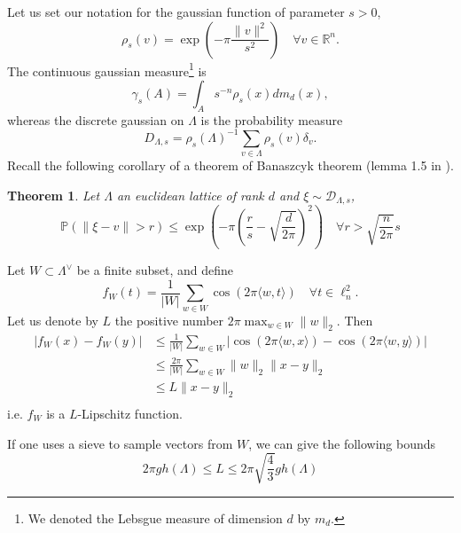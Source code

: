 \documentclass{article}
\newtheorem{theorem}{Theorem}
\begin{document}
Let us set our notation for the gaussian function of parameter $s>0$, 
$$\rho_s(v)=\exp(-\pi\frac{\|v\|^2 }{s^2} )\quad \forall v\in \mathbb R^n.$$
The continuous gaussian measure\footnote{We denoted the Lebsgue measure of dimension $d$ by $m_d$.} is 
$$\gamma_s(A) =  \int_A s^{-n}\rho_s(x)dm_d(x) ,$$
whereas the discrete gaussian on $\Lambda$ is the probability measure 
$$D_{\Lambda , s} = \rho_s(\Lambda )^{-1} \sum_{v\in \Lambda} \rho_s(v)\delta_v. $$
Recall the following corollary of a theorem of Banaszcyk theorem (lemma 1.5 in \cite{banaszczyk1993new}).

\begin{theorem}
Let $\Lambda$ an euclidean lattice of rank $d$ and $\xi \sim \mathcal D_{\Lambda , s}$,
$$\mathbb P(\|\xi - v\|> r ) \leq \exp(-\pi (\frac{r}{s} -\sqrt{\frac{d}{2\pi}})^2) \quad \forall r >\sqrt{\frac{n}{2\pi}}s $$
\end{theorem}

Let $W\subset \Lambda^\vee$ be a finite subset, and define 
$$f_W(t) = \frac{1}{|W|}\sum_{w\in W} \cos(2\pi \langle w , t \rangle) \quad \forall t \in \ell^2_n.$$
Let us denote by $L$ the positive number $2\pi\max_{w\in W} \|w\|_2$. Then
\[\begin{split}
|f_W(x) -f_W(y)| & \leq \frac{1}{|W|}\sum_{w\in W} |\cos(2\pi \langle w , x \rangle ) -\cos(2\pi \langle w , y \rangle) | \\
		 & \leq \frac{2\pi}{|W|}\sum_{w\in W} \|w\|_2 \|x-y\|_2\\
		 & \leq L\|x-y\|_2\\ 
\end{split}\]
i.e. $f_W$ is a $L$-Lipschitz function.  

If one uses a sieve to sample vectors from $W$, we can give the following bounds 
$$2\pi gh(\Lambda) \leq L \leq 2\pi\sqrt{\frac{4}{3}}gh(\Lambda) $$



\end{document}
